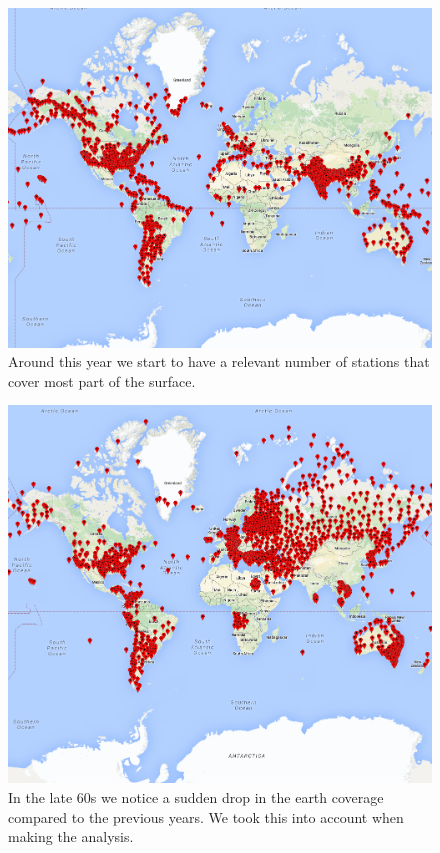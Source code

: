 \documentclass{vldb}
\begin{document}
\begin{figure}[tbh]
\includegraphics[width=1\linewidth]{stations1945}
\caption{Around this year we start to have a relevant number of stations that cover most part of the surface.}
\label{fig:stations1945}
\end{figure}
\begin{figure}[tbh]
\includegraphics[width=1\linewidth]{stations1968}
\caption{In the late 60s we notice a sudden drop in the earth coverage compared to the previous years. We took this into account when making the analysis.}
\label{fig:stations1968}
\end{figure}
\end{document}

